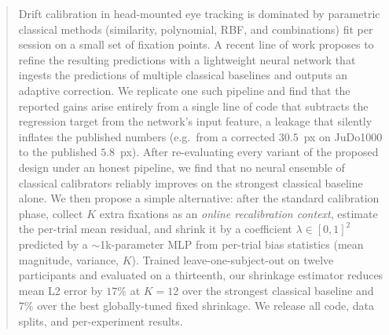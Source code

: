 \begin{abstract}
Drift calibration in head-mounted eye tracking is dominated by parametric
classical methods (similarity, polynomial, RBF, and combinations) fit per
session on a small set of fixation points. A recent line of work proposes
to refine the resulting predictions with a lightweight neural network that
ingests the predictions of multiple classical baselines and outputs an
adaptive correction. We replicate one such pipeline and find that the
reported gains arise entirely from a single line of code that subtracts the
regression target from the network's input feature, a leakage that
silently inflates the published numbers (e.g.\ from a corrected $30.5$~px
on JuDo1000 to the published $5.8$~px). After re-evaluating every variant
of the proposed design under an honest pipeline, we find that no neural
ensemble of classical calibrators reliably improves on the strongest
classical baseline alone. We then propose a simple alternative: after the
standard calibration phase, collect $K$ extra fixations as an
\emph{online recalibration context}, estimate the per-trial mean residual,
and shrink it by a coefficient $\lambda \in [0,1]^2$ predicted by a
$\sim$1k-parameter MLP from per-trial bias statistics (mean magnitude,
variance, $K$). Trained leave-one-subject-out on twelve participants and
evaluated on a thirteenth, our shrinkage estimator reduces mean L2 error
by $17\%$ at $K=12$ over the strongest classical baseline and $7\%$ over
the best globally-tuned fixed shrinkage. We release all code, data
splits, and per-experiment results.
\end{abstract}
